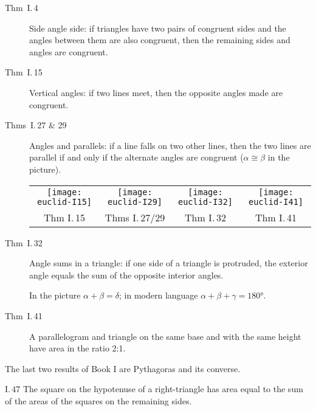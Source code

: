 \begin{description}
  \item[\normalfont Thm\ I.\,4] Side angle side: if triangles have two pairs of congruent sides and the angles between them are also congruent, then the remaining sides and angles are congruent.
  \item[\normalfont Thm\ I.\,15] Vertical angles: if two lines meet, then the opposite angles made are congruent.
  \item[\normalfont Thms\ I.\,27 \& 29] Angles and parallels: if a line falls on two other lines, then the two lines are parallel if and only if the alternate angles are congruent ($\alpha\cong \beta$ in the picture).
  \begin{center}
	  \begin{tabular}{@{}c@{\qquad}c@{\quad}c@{\quad}c@{}}
		  \texttt{[image: euclid-I15]}
		  &
		  \texttt{[image: euclid-I29]}
		  &
		  \texttt{[image: euclid-I32]}
		  &
		  \texttt{[image: euclid-I41]}
		  \\
		  Thm I.\,15
		  &
		  Thms I.\,27/29
		  &
		  Thm I.\,32
		  &
		  Thm I.\,41
	  \end{tabular}
  \end{center}
  \item[\normalfont Thm\ I.\,32] Angle sums in a triangle: if one side of a triangle is protruded, the exterior angle equals the sum of the opposite interior angles.\par
  In the picture $\alpha+\beta=\delta$; in modern language $\alpha+\beta+\gamma=\ang{180}$.
  \item[\normalfont Thm\ I.\,41] A parallelogram and triangle on the same base and with the same height have area in the ratio 2:1.
\end{description}

The last two results of Book I are Pythagoras and its converse.

\begin{thm*}{I.\,47}{}
	The square on the hypotenuse of a right-triangle has area equal to the sum of the areas of the squares on the remaining sides.
\end{thm*}

